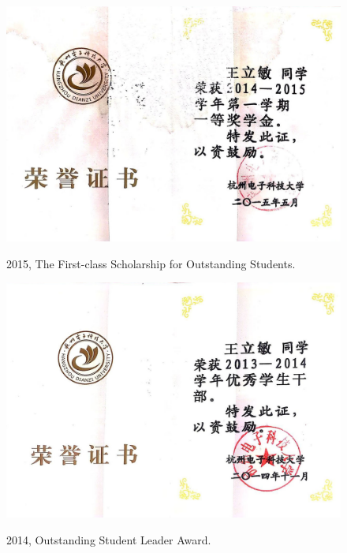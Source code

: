 \documentclass[11pt]{article}
\begin{document}
{\begin{figure}[ht]
	\centering
	\includegraphics[width=14cm]{fig/cer5.jpg}\\
	\caption{2015, The First-class Scholarship for Outstanding Students.}
\end{figure}

\begin{figure}[ht]
	\centering
	\includegraphics[width=14cm]{fig/cer6.jpg}\\
	\caption{2014, Outstanding Student Leader Award.}
\end{figure}

}
\end{document}
